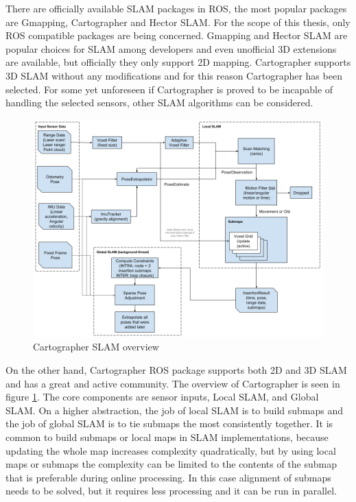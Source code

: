 There are officially available SLAM packages in ROS, the most popular packages are Gmapping, Cartographer and 
Hector SLAM. For the scope of this thesis, only ROS compatible packages are being concerned. Gmapping and Hector
SLAM are popular choices for SLAM among developers and even unofficial 3D extensions are available, but 
officially they only support 2D mapping. Cartographer supports 3D SLAM without any modifications and for 
this reason Cartographer has been selected. For some yet unforeseen if Cartographer is proved to be incapable
of handling the selected sensors, other SLAM algorithms can be considered.
\begin{figure}[!ht]
    \centering
	\includegraphics[width=140mm, keepaspectratio]{figures/cartographer_slam.png}
    \caption{Cartographer SLAM overview\cite{CartographerDocumentation}}
    \label{fig:cartographer_slam_overview}
\end{figure}



On the other hand, Cartographer ROS package supports both 2D and 3D SLAM and has a great and active community. The overview 
of Cartographer is seen in figure \ref{fig:cartographer_slam_overview}. The core components are sensor inputs, Local SLAM,
and Global SLAM. On a higher abstraction, the job of local SLAM is to build submaps and the job of global SLAM is to tie 
submaps the most consistently together. It is common to build submaps or local maps in SLAM implementations, because
updating the whole map increases complexity quadratically, but by using local maps or submaps the complexity can be limited
to the contents of the submap that is preferable during online processing. In this case alignment of submaps needs to be solved,
but it requires less processing and it can be run in parallel.

